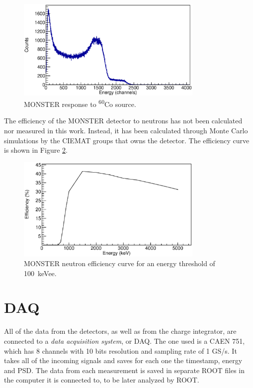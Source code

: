 \documentclass[a4paper,12pt]{report}
\begin{document}
\begin{figure}[H]
	\centering
	\includegraphics[width=0.80\textwidth]{monster_co_calibration.eps}
	\caption{MONSTER response to \textsuperscript{60}Co source.}
	\label{monster_co_calibration}
\end{figure}

The efficiency of the MONSTER detector to neutrons has not been calculated nor measured in this work.
Instead, it has been calculated through Monte Carlo simulations by the CIEMAT groups that owns the detector.
The efficiency curve is shown in Figure \ref{monster_efficiency}.

\begin{figure}[H]
	\centering
	\includegraphics[width=0.80\textwidth]{monster_efficiency.eps}
	\caption{MONSTER neutron efficiency curve for an energy threshold of \qty{100}{keVee}.}
	\label{monster_efficiency}
\end{figure}

\section{DAQ}
All of the data from the detectors, as well as from the charge integrator, are connected to a \textit{data acquisition system}, or DAQ.
The one used is a CAEN 751, which has 8 channels with 10 bits resolution and sampling rate of 1 GS/s.\cite{CAEN}
It takes all of the incoming signals and saves for each one the timestamp, energy and PSD.
The data from each measurement is saved in separate ROOT files in the computer it is connected to, to be later analyzed by ROOT.\cite{ROOT}
\end{document}
